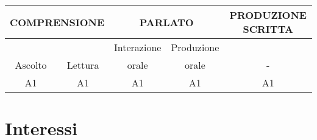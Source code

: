 \documentclass[11pt,a4paper,sans]{moderncv} %
\begin{document}
{%
	\centering
	\begin{tabular}{*{5}{c}}
		\toprule
		\multicolumn{2}{c}{\textcolor{cvcolor}{COMPRENSIONE}} & \multicolumn{2}{c}{\textcolor{cvcolor}{PARLATO}}          & \textcolor{cvcolor}{PRODUZIONE SCRITTA} \\ \midrule
		& & \textcolor{cvcolor}{Interazione} & \textcolor{cvcolor}{Produzione} & \\
		\textcolor{cvcolor}{Ascolto}         & \textcolor{cvcolor}{Lettura}        &  \textcolor{cvcolor}{orale} &  \textcolor{cvcolor}{orale} & -       \\             A1                & A1              & A1                 & A1                & A1      \\ \bottomrule
	\end{tabular}%
}{}


\section{Interessi}

\renewcommand{\listitemsymbol}{-~} %








\end{document}
